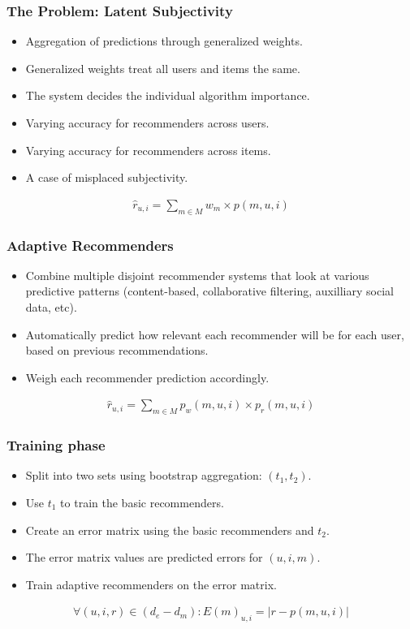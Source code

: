 \documentclass[screen]{beamer}
\begin{document}
\begin{frame}
  \frametitle{The Problem: Latent Subjectivity}
  \begin{itemize}
    \item Aggregation of predictions through generalized weights.
    \item Generalized weights treat all users and items the same.
    \item The system decides the individual algorithm importance.
    \item Varying accuracy for recommenders across users.
    \item Varying accuracy for recommenders across items.
    \item A case of misplaced subjectivity.
  \end{itemize}
  \begin{eqnarray}
    \hat{r}_{u,i} = \sum_{m \in M} w_{m} \times p(m,u,i)
  \end{eqnarray}
\end{frame}

\begin{frame}
  \frametitle{Adaptive Recommenders}
  \begin{itemize}
    \item Combine multiple disjoint recommender systems that look at various predictive patterns 
      (content-based, collaborative filtering, auxilliary social data, etc).
    \item Automatically predict how relevant each recommender will be for each user,
      based on previous recommendations.
    \item Weigh each recommender prediction accordingly.
  \end{itemize}
  \begin{eqnarray}
    \hat{r}_{u,i} = \sum_{m \in M} p_{w}(m,u,i) \times p_{r}(m,u,i)
  \end{eqnarray}
\end{frame}

\begin{frame}
  
\end{frame}

\begin{frame}
  \frametitle{Training phase}
  
  \begin{itemize}
    \item Split into two sets using bootstrap aggregation: $(t_1,t_2)$.
    \item Use $t_1$ to train the basic recommenders.
    \item Create an error matrix using the basic recommenders and $t_2$. 
    \item The error matrix values are predicted errors for $(u,i,m)$.
    \item Train adaptive recommenders on the error matrix.
  \end{itemize}
  
  \begin{eqnarray}
    \forall (u,i,r) \in (d_e - d_m): E(m)_{u,i} = |r - p(m,u,i)|
  \end{eqnarray}
\end{frame}
\end{document}
